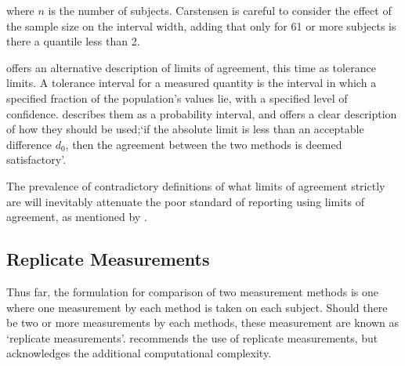 \documentclass[12pt, a4paper]{report}
\begin{document}
	\noindent where $n$ is the number of subjects. Carstensen is
	careful to consider the effect of the sample size on the interval
	width, adding that only for 61 or more subjects is there a
	quantile less than 2.
	
	\citet{luiz} offers an alternative description of limits of
	agreement, this time as tolerance limits. A tolerance interval for
	a measured quantity is the interval in which a specified fraction
	of the population's values lie, with a specified level of
	confidence. \citet{Barnhart} describes them as a probability
	interval, and offers a clear description of how they should be
	used;`if the absolute limit is less than an acceptable difference
	$d_{0}$, then the agreement between the two methods is deemed
	satisfactory'.
	
	The prevalence of contradictory definitions of what limits of agreement strictly are will inevitably attenuate the poor standard of reporting using limits of agreement, as mentioned by \citet{mantha}.
	
	
	
	
	
	
	
	\subsection{Replicate Measurements}
	
	Thus far, the formulation for comparison of two measurement
	methods is one where one measurement by each method is taken on	each subject. Should there be two or more measurements by each methods, these measurement are known as `replicate measurements'.
	\citet{BXC2008} recommends the use of replicate measurements, but acknowledges the additional computational complexity.
	
\end{document}
